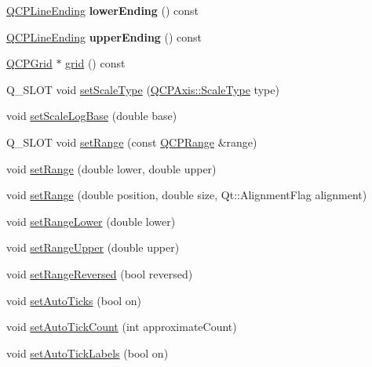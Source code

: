 \begin{DoxyCompactItemize}
\item 
\hyperlink{class_q_c_p_line_ending}{Q\+C\+P\+Line\+Ending} {\bfseries lower\+Ending} () const \hypertarget{class_q_c_p_axis_ac85aebbedf67d7bc9e1e5c182151536b}{}\label{class_q_c_p_axis_ac85aebbedf67d7bc9e1e5c182151536b}

\item 
\hyperlink{class_q_c_p_line_ending}{Q\+C\+P\+Line\+Ending} {\bfseries upper\+Ending} () const \hypertarget{class_q_c_p_axis_aad503ac95ee34e614ffee0bd66473e1a}{}\label{class_q_c_p_axis_aad503ac95ee34e614ffee0bd66473e1a}

\item 
\hyperlink{class_q_c_p_grid}{Q\+C\+P\+Grid} $\ast$ \hyperlink{class_q_c_p_axis_ac4fb913cce3072b5e75a4635e0f6cd04}{grid} () const 
\item 
Q\+\_\+\+S\+L\+OT void \hyperlink{class_q_c_p_axis_adef29cae617af4f519f6c40d1a866ca6}{set\+Scale\+Type} (\hyperlink{class_q_c_p_axis_a36d8e8658dbaa179bf2aeb973db2d6f0}{Q\+C\+P\+Axis\+::\+Scale\+Type} type)
\item 
void \hyperlink{class_q_c_p_axis_a726186054be90487885a748aa1b42188}{set\+Scale\+Log\+Base} (double base)
\item 
Q\+\_\+\+S\+L\+OT void \hyperlink{class_q_c_p_axis_aebdfea5d44c3a0ad2b4700cd4d25b641}{set\+Range} (const \hyperlink{class_q_c_p_range}{Q\+C\+P\+Range} \&range)
\item 
void \hyperlink{class_q_c_p_axis_a57d6ee9e9009fe88cb19db476ec70bca}{set\+Range} (double lower, double upper)
\item 
void \hyperlink{class_q_c_p_axis_acf60e5b2d631fbc8c4548c3d579cb6d0}{set\+Range} (double position, double size, Qt\+::\+Alignment\+Flag alignment)
\item 
void \hyperlink{class_q_c_p_axis_afcf51227d337db28d1a9ce9a4d1bc91a}{set\+Range\+Lower} (double lower)
\item 
void \hyperlink{class_q_c_p_axis_acd3ca1247aa867b540cd5ec30ccd3bef}{set\+Range\+Upper} (double upper)
\item 
void \hyperlink{class_q_c_p_axis_a2172fdb196b1a0dc3f40992fcad8e9e1}{set\+Range\+Reversed} (bool reversed)
\item 
void \hyperlink{class_q_c_p_axis_ae867c23d3a6a7bd4d09cc66c5d018f63}{set\+Auto\+Ticks} (bool on)
\item 
void \hyperlink{class_q_c_p_axis_a7c7111cbeac9ec5fcb40f93a1ef51a0b}{set\+Auto\+Tick\+Count} (int approximate\+Count)
\item 
void \hyperlink{class_q_c_p_axis_aaa47e3a6bac0c20d4beb9028f01bc1a1}{set\+Auto\+Tick\+Labels} (bool on)

\end{DoxyCompactItemize}
